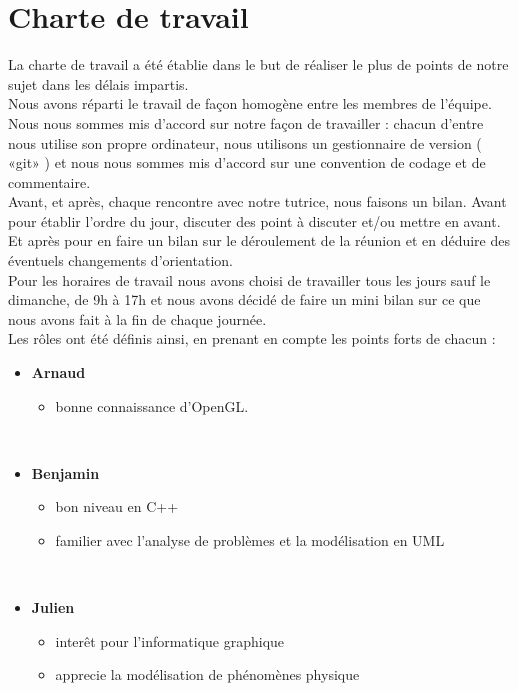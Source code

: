 \documentclass[a4paper,10pt]{article}
\begin{document}
\section{Charte de travail}
La charte de travail a été établie dans le but de réaliser le plus de
points de notre sujet dans les délais impartis.  \\

Nous avons réparti le travail de façon homogène entre les membres de
l'équipe.  Nous nous sommes mis d'accord sur notre façon de travailler
: chacun d'entre nous utilise son propre ordinateur, nous utilisons un
gestionnaire de version ( «git» ) et nous nous sommes mis d'accord sur
une convention de codage et de commentaire. \\

Avant, et après, chaque rencontre avec notre tutrice, nous faisons un bilan. Avant pour
établir l'ordre du jour, discuter des point à discuter et/ou mettre en
avant. Et après pour en faire un bilan sur le déroulement de la
réunion et en déduire des éventuels changements d'orientation. \\

Pour les horaires de travail nous avons choisi de travailler tous
les jours sauf le dimanche, de 9h à 17h et nous avons décidé de faire
un mini bilan sur ce que nous avons fait à la fin de chaque journée.\\

Les rôles ont été définis ainsi, en prenant en compte les points forts
de chacun :\\

\begin{itemize}

\item \textbf{Arnaud}
\begin{itemize}
\item bonne connaissance d'OpenGL.
\end{itemize}
\quad \\

\item \textbf{Benjamin}
\begin{itemize}
\item bon niveau en C++
\item familier avec l'analyse de problèmes et la modélisation en UML
\end{itemize}
\quad \\

\item \textbf{Julien}
\begin{itemize}
\item interêt pour l'informatique graphique
\item apprecie la modélisation de phénomènes physique
\end{itemize}
\quad \\

\end{itemize}
\end{document}
